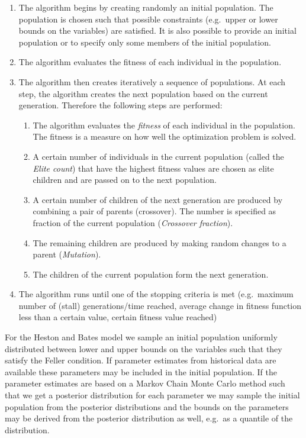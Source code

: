 \documentclass[10pt,a4paper]{article}
\numberwithin{equation}{section} %
\theoremstyle{plain}
\theoremstyle{definition}
\theoremstyle{remark}
\begin{document}
\begin{enumerate}
\item The algorithm begins by creating randomly an initial population. The population is chosen such that possible constraints (e.g.\ upper or lower bounds on the variables) are satisfied. It is also possible to provide an initial population or to specify only some members of the initial population.
\item The algorithm evaluates the fitness of each individual in the population. 
\item The algorithm then creates iteratively a sequence of populations. At each step, the algorithm creates the next population based on the current generation. Therefore the following steps are performed: 
	\begin{enumerate}
	\item The algorithm evaluates the \emph{fitness} of each individual in the population. The fitness is a measure on how well the optimization problem is solved.
	\item A certain number of individuals in the current population (called the \emph{Elite count}) that have the highest fitness values are chosen as elite children and are passed on to the next population. 
	\item A certain number of children of the next generation are produced by combining a pair of parents (crossover). The number is specified as fraction of the current population (\emph{Crossover fraction}).
	\item The remaining children are produced by making random changes to a parent (\emph{Mutation}).  
	\item The children of the current population form the next generation.
	\end{enumerate}
\item The algorithm runs until one of the stopping criteria is met (e.g.\ maximum number of (stall) generations/time reached, average change in fitness function less than a certain value, certain fitness value reached) 
\end{enumerate}

For the Heston and Bates model we sample an initial population uniformly distributed between lower and upper bounds on the variables such that they satisfy the Feller condition. If parameter estimates from historical data are available these parameters may be included in the initial population. If the parameter estimates are based on a Markov Chain Monte Carlo method such that we get a posterior distribution for each parameter we may sample the initial population from the posterior distributions and the bounds on the parameters may be derived from the posterior distribution as well, e.g.\ as a quantile of the distribution.
\end{document}
